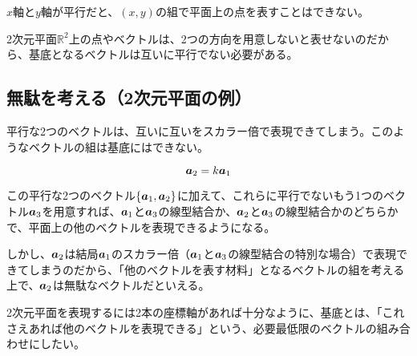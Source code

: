 \documentclass[../../../topic_linear-algebra]{subfiles}
\begin{document}
\begin{center}
\end{center}

$x$軸と$y$軸が平行だと、$(x,y)$の組で平面上の点を表すことはできない。

2次元平面$\mathbb{R}^2$上の点やベクトルは、2つの方向を用意しないと表せないのだから、基底となるベクトルは互いに平行でない必要がある。

\subsection{無駄を考える（2次元平面の例）}

平行な2つのベクトルは、互いに互いをスカラー倍で表現できてしまう。このようなベクトルの組は基底にはできない。

\begin{equation*}
  \vb*{a}_2 = k \vb*{a}_1
\end{equation*}

この平行な2つのベクトル$\{\vb*{a}_1,\vb*{a}_2\}$に加えて、これらに平行でないもう1つのベクトル$\vb*{a}_3$を用意すれば、$\vb*{a}_1$と$\vb*{a}_3$の線型結合か、$\vb*{a}_2$と$\vb*{a}_3$の線型結合かのどちらかで、平面上の他のベクトルを表現できるようになる。

\br

しかし、$\vb*{a}_2$は結局$\vb*{a}_1$のスカラー倍（$\vb*{a}_1$と$\vb*{a}_3$の線型結合の特別な場合）で表現できてしまうのだから、「他のベクトルを表す材料」となるベクトルの組を考える上で、$\vb*{a}_2$は無駄なベクトルだといえる。

\br

2次元平面を表現するには2本の座標軸があれば十分なように、基底とは、「これさえあれば他のベクトルを表現できる」という、必要最低限のベクトルの組み合わせにしたい。
\end{document}
